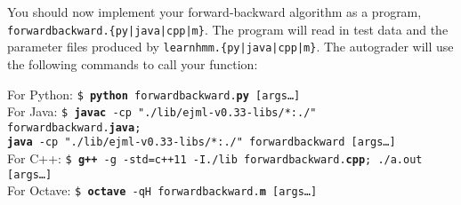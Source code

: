 \documentclass{article}
\begin{document}
You should now implement your forward-backward algorithm as a program, \texttt{forwardbackward.\{py|java|cpp|m\}}. The program will read in test data and the parameter files produced by \texttt{learnhmm.\{py|java|cpp|m\}}. The autograder will use the following commands to call your function:

\begin{tabbing}
For Python: \=\texttt{\$ \textbf{python} forwardbackward.\textbf{py} [args\dots]}\\
For Java: \>\texttt{\$ \textbf{javac} -cp "./lib/ejml-v0.33-libs/*:./" forwardbackward.\textbf{java};\\ \>  \texttt{\textbf{java} -cp "./lib/ejml-v0.33-libs/*:./" forwardbackward [args\dots]}}\\
For C++: \>\texttt{\$ \textbf{g++} -g -std=c++11 -I./lib forwardbackward.\textbf{cpp}; ./a.out [args\dots]}\\
For Octave: \>\texttt{\$ \textbf{octave} -qH forwardbackward.\textbf{m} [args\dots]}
\end{tabbing}
\end{document}
